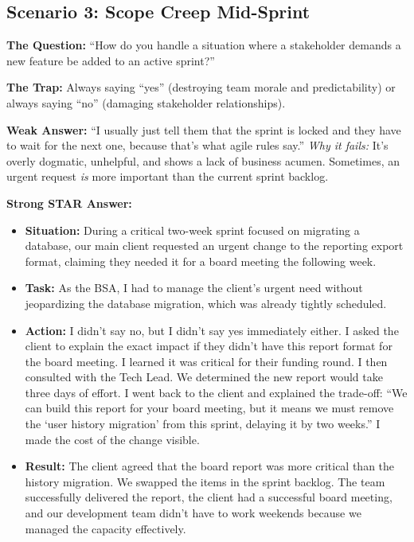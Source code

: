 \documentclass[
  11pt,
  openany,
  oneside]{book}
\providecommand{\tightlist}{%
  \setlength{\itemsep}{0pt}\setlength{\parskip}{0pt}}
\begin{document}
\subsection{Scenario 3: Scope Creep
Mid-Sprint}\label{scenario-3-scope-creep-mid-sprint}

\textbf{The Question:} ``How do you handle a situation where a
stakeholder demands a new feature be added to an active sprint?''

\textbf{The Trap:} Always saying ``yes'' (destroying team morale and
predictability) or always saying ``no'' (damaging stakeholder
relationships).

\textbf{Weak Answer:} ``I usually just tell them that the sprint is
locked and they have to wait for the next one, because that's what agile
rules say.'' \emph{Why it fails:} It's overly dogmatic, unhelpful, and
shows a lack of business acumen. Sometimes, an urgent request \emph{is}
more important than the current sprint backlog.

\textbf{Strong STAR Answer:}

\begin{itemize}
\tightlist
\item
  \textbf{Situation:} During a critical two-week sprint focused on
  migrating a database, our main client requested an urgent change to
  the reporting export format, claiming they needed it for a board
  meeting the following week.
\item
  \textbf{Task:} As the BSA, I had to manage the client's urgent need
  without jeopardizing the database migration, which was already tightly
  scheduled.
\item
  \textbf{Action:} I didn't say no, but I didn't say yes immediately
  either. I asked the client to explain the exact impact if they didn't
  have this report format for the board meeting. I learned it was
  critical for their funding round. I then consulted with the Tech Lead.
  We determined the new report would take three days of effort. I went
  back to the client and explained the trade-off: ``We can build this
  report for your board meeting, but it means we must remove the `user
  history migration' from this sprint, delaying it by two weeks.'' I
  made the cost of the change visible.
\item
  \textbf{Result:} The client agreed that the board report was more
  critical than the history migration. We swapped the items in the
  sprint backlog. The team successfully delivered the report, the client
  had a successful board meeting, and our development team didn't have
  to work weekends because we managed the capacity effectively.
\end{itemize}
\end{document}
